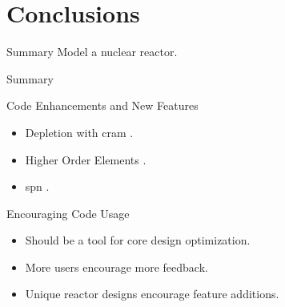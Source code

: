 \section{Conclusions}
\label{sec:conclusions}

\begin{frame}{Summary}
  \huge Model a nuclear reactor.
\end{frame}

\begin{frame}{Summary}
  
\end{frame}

\begin{frame}{Code Enhancements and New Features}
  \begin{itemize}
    \item Depletion with \gls{cram} \cite{cram}.
    \item Higher Order Elements \cite{Hosseini2013}.
    \item \gls{spn} \cite{Ryu2013}.
  \end{itemize}
\end{frame}

\begin{frame}{Encouraging Code Usage}
  \begin{itemize}
    \item Should be a tool for core design optimization.
    \item More users encourage more feedback.
    \item Unique reactor designs encourage feature additions.
  \end{itemize}
\end{frame}
